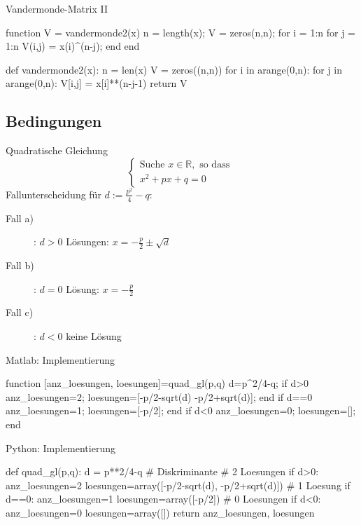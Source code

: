 \documentclass[hyperref={xetex}]{beamer}
\begin{document}
%
%
%
\begin{frame}[fragile]{Vandermonde-Matrix II}
  \begin{matlabin}
function V = vandermonde2(x)
  n = length(x);
  V = zeros(n,n);
  for i = 1:n
    for j = 1:n
      V(i,j) = x(i)^(n-j);
    end
  end
  \end{matlabin}
  \begin{pyin}
def vandermonde2(x):
  n = len(x)
  V = zeros((n,n))
  for i in arange(0,n):
    for j in arange(0,n):
      V[i,j] = x[i]**(n-j-1)
  return V
  \end{pyin}
\end{frame}



\subsection{Bedingungen}
%
%
%
\begin{frame}[fragile]{Quadratische Gleichung}
\alert{ \[  \left\{ \begin{array}{l} \mbox{Suche }  x \in \mathbb{R},
 \mbox{ so dass } \\
 x^2+px +q =0  \end{array} \right. \]}
Fallunterscheidung für $d:=\frac{p^2}{4} -q$:
\begin{description}
\item [Fall a)]: \alert{ $d>0$}  Lösungen: $x=-\frac{p}{2} \pm \sqrt{d}$ \\
\item [Fall b)]: \alert{ $d=0$}  Lösung: $x=-\frac{p}{2}$\\
\item [Fall c)]: \alert{ $d<0$} \quad keine Lösung
\end{description}
\end{frame} 
%
%
%
\begin{frame}[fragile]{Matlab: Implementierung}
\begin{matlabin}
function [anz_loesungen, loesungen]=quad_gl(p,q)
d=p^2/4-q; %
if d>0 
    anz_loesungen=2;
    loesungen=[-p/2-sqrt(d) -p/2+sqrt(d)];
end
if d==0 
    anz_loesungen=1;
    loesungen=[-p/2];
end
if d<0 
    anz_loesungen=0;
    loesungen=[];
end
\end{matlabin}
\end{frame}
%
%
%
\begin{frame}[fragile]{Python: Implementierung}
\begin{pyin}
def quad_gl(p,q):
    d = p**2/4-q # Diskriminante
    # 2 Loesungen
    if d>0:
        anz_loesungen=2
        loesungen=array([-p/2-sqrt(d), -p/2+sqrt(d)])
    # 1 Loesung
    if d==0:
        anz_loesungen=1
        loesungen=array([-p/2])
    # 0 Loesungen
    if d<0:
        anz_loesungen=0
        loesungen=array([])
    return anz_loesungen, loesungen
\end{pyin}
\end{frame}
\end{document}
